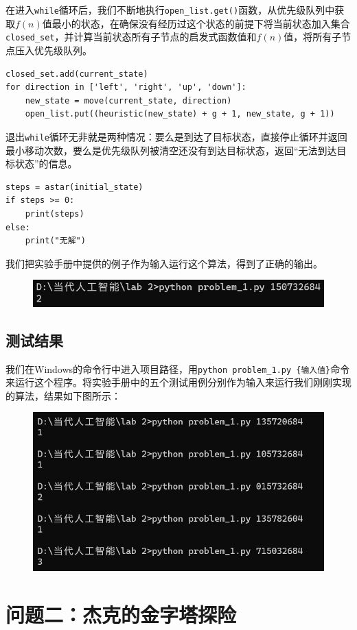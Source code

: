 \documentclass{article}
\begin{document}
在进入\lstinline|while|循环后，我们不断地执行\lstinline|open_list.get()|函数，从优先级队列中获取$f(n)$值最小的状态，在确保没有经历过这个状态的前提下将当前状态加入集合\lstinline|closed_set|，并计算当前状态所有子节点的启发式函数值和$f(n)$值，将所有子节点压入优先级队列。
\begin{lstlisting}
closed_set.add(current_state)
for direction in ['left', 'right', 'up', 'down']:
    new_state = move(current_state, direction)
    open_list.put((heuristic(new_state) + g + 1, new_state, g + 1))
\end{lstlisting}

退出\lstinline|while|循环无非就是两种情况：要么是到达了目标状态，直接停止循环并返回最小移动次数，要么是优先级队列被清空还没有到达目标状态，返回“无法到达目标状态”的信息。
\begin{lstlisting}
steps = astar(initial_state)
if steps >= 0:
    print(steps)
else:
    print("无解")
\end{lstlisting}

我们把实验手册中提供的例子作为输入运行这个算法，得到了正确的输出。
\begin{figure}[H]
    \centering
    \includegraphics[width=0.5\linewidth]{image7.png}
    \label{fig:enter-label}
\end{figure}

\subsection{测试结果}
我们在Windows的命令行中进入项目路径，用\lstinline|python problem_1.py {输入值}|命令来运行这个程序。将实验手册中的五个测试用例分别作为输入来运行我们刚刚实现的算法，结果如下图所示：
\begin{figure}[H]
    \centering
    \includegraphics[width=0.5\linewidth]{image1.png}
    \label{fig:enter-label}
\end{figure}

\section{问题二：杰克的⾦字塔探险}
\end{document}
